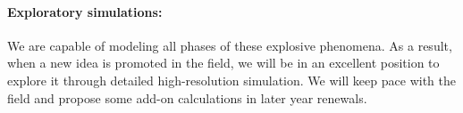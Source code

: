 \paragraph{Exploratory simulations: }
%
We are
capable of modeling all phases of these explosive phenomena.  As a
result, when a new idea is promoted in the field, we will be in an
excellent position to explore it through detailed high-resolution
simulation.  We will keep pace with the field and propose some add-on
calculations in later year renewals. 



